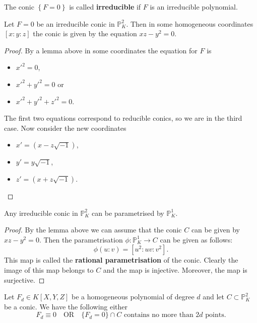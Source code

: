 \documentclass[12pt, a4paper]{article}
\newcommand{\PP}{\mathbb P}
\begin{document}
\begin{definition}
    The conic \(\left\{ F=0 \right\}\) is called \textbf{irreducible} if \(F\) is an irreducible polynomial.
\end{definition}

\begin{mdlemma}
    Let \(F=0\) be an irreducible conic in \(\PP^2_K\). Then in some homogeneous coordinates \([x:y:z]\) the conic is given by the equation \(xz-y^2=0\).
\end{mdlemma}

\begin{proof}
    By a lemma above in some coordinates the equation for \(F\) is 
    \begin{itemize}
        \item \(x'^2=0\),
        \item \(x'^2+y'^2=0\) or 
        \item \(x'^2+y'^2+z'^2=0\).
    \end{itemize}
    The first two equations correspond to reducible conics, so we are in the third case. Now consider the new coordinates
    \begin{itemize}
        \item \(x'=(x-z\sqrt{-1})\),
        \item \(y'=y\sqrt{-1}\),
        \item \(z'=(x+z\sqrt{-1})\).
    \end{itemize}
\end{proof}

\begin{mdcor}
    Any irreducible conic in \(\PP^2_K\) can be parametrised by \(\PP^1_K\).
\end{mdcor}

\begin{proof}
    By the lemma above we can assume that the conic \(C\) can be given by \(xz-y^2=0\). Then the parametrisation \(\phi:\PP^1_K \to C\) can be given as follows:
    \[\phi(u:v)=[u^2:uv:v^2].\]
    This map is called the \textbf{rational parametrisation} of the conic. Clearly the image of this map belongs to \(C\) and the map is injective. Moreover, the map is surjective. 
\end{proof}

\begin{mdlemma}
    Let \(F_d\in K[X,Y,Z]\) be a homogeneous polynomial of degree \(d\) and let \(C \subset \PP^2_K\) be a conic. We have the following either 
    \[F_d \equiv 0 \quad\text{OR}\quad \{F_d = 0\} \cap C \text{ contains no more than \(2d\) points.}\]
\end{mdlemma}
\end{document}
